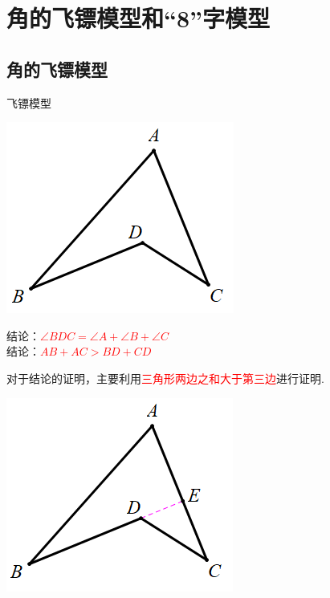 
\section{角的飞镖模型和“8”字模型}
\subsection{角的飞镖模型}

\begin{custom}[explorecolor]{飞镖模型}
\begin{minipage}{0.3\textwidth}
 \includegraphics[scale=0.3]{figure/feibiao01.PNG}
\end{minipage}
\begin{minipage}{0.6\textwidth}
结论：\textcolor{red}{$\angle BDC=\angle A+\angle B+\angle C$}\\
结论：\textcolor{red}{$AB+AC>BD+CD$}
\end{minipage}
\end{custom}








对于结论的证明，主要利用\textcolor{red}{三角形两边之和大于第三边}进行证明.

\begin{minipage}{0.6\textwidth}

\kaishu\color{cyan}{证明：延长$BD$，交$AC$于点$E$，如图.\\
$\because AB+AE>BE, CE+DE>CD\\ 
\therefore AB+AE+CE+DE>BE+CD\\
\therefore AB+AC+DE>BD+DE+CD\\
\therefore AB+AC>BD+CD$}
\end{minipage}
\begin{minipage}{0.4\textwidth}
 \includegraphics[scale=0.5]{figure/feibiao02.PNG}
\end{minipage}

